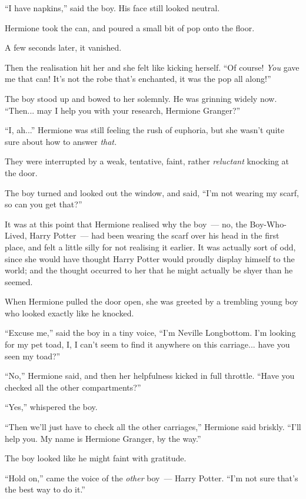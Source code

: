 ``I have napkins,'' said the boy. His face still looked neutral.

Hermione took the can, and poured a small bit of pop onto the floor.

A few seconds later, it vanished.

Then the realisation hit her and she felt like kicking herself. ``Of course! \emph{You} gave me that can! It's not the robe that's enchanted, it was the pop all along!''

The boy stood up and bowed to her solemnly. He was grinning widely now. ``Then... may I help you with your research, Hermione Granger?''

``I, ah...'' Hermione was still feeling the rush of euphoria, but she wasn't quite sure about how to answer \emph{that.}

They were interrupted by a weak, tentative, faint, rather \emph{reluctant} knocking at the door.

The boy turned and looked out the window, and said, ``I'm not wearing my scarf, so can you get that?''

It was at this point that Hermione realised why the boy~--- no, the Boy-Who-Lived, Harry Potter~--- had been wearing the scarf over his head in the first place, and felt a little silly for not realising it earlier. It was actually sort of odd, since she would have thought Harry Potter would proudly display himself to the world; and the thought occurred to her that he might actually be shyer than he seemed.

When Hermione pulled the door open, she was greeted by a trembling young boy who looked exactly like he knocked.

``Excuse me,'' said the boy in a tiny voice, ``I'm Neville Longbottom. I'm looking for my pet toad, I, I can't seem to find it anywhere on this carriage... have you seen my toad?''

``No,'' Hermione said, and then her helpfulness kicked in full throttle. ``Have you checked all the other compartments?''

``Yes,'' whispered the boy.

``Then we'll just have to check all the other carriages,'' Hermione said briskly. ``I'll help you. My name is Hermione Granger, by the way.''

The boy looked like he might faint with gratitude.

``Hold on,'' came the voice of the \emph{other} boy~--- Harry Potter. ``I'm not sure that's the best way to do it.''

